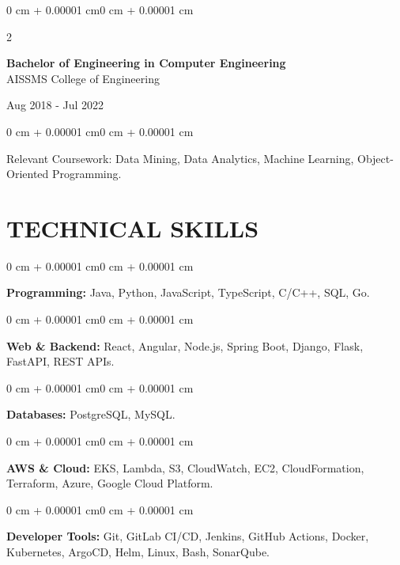\documentclass[10pt, letterpaper]{article}
\newenvironment{onecolentry}{
    \begin{adjustwidth}{0 cm + 0.00001 cm}{0 cm + 0.00001 cm}
}{
    \end{adjustwidth}
}
\newenvironment{twocolentry}[2][]{
    \onecolentry
    \def\secondColumn{#2}
    \setcolumnwidth{\fill, 4.5 cm}
    \begin{paracol}{2}
}{
    \switchcolumn \raggedleft \secondColumn
    \end{paracol}
    \endonecolentry
}
\begin{document}
\begin{twocolentry}{
    Aug 2018 - Jul 2022
}
    \textbf{Bachelor of Engineering in Computer Engineering} \\
    AISSMS College of Engineering
\end{twocolentry}
\begin{onecolentry}
Relevant Coursework: Data Mining, Data Analytics, Machine Learning, Object-Oriented Programming.
\end{onecolentry}
\section{TECHNICAL SKILLS}
\begin{onecolentry}
\textbf{Programming:} Java, Python, JavaScript, TypeScript, C/C++, SQL, Go.
\end{onecolentry}
\vspace{0.06 cm}
\begin{onecolentry}
\textbf{Web \& Backend:} React, Angular, Node.js, Spring Boot, Django, Flask, FastAPI, REST APIs.
\end{onecolentry}
\vspace{0.06 cm}
\begin{onecolentry}
\textbf{Databases:} PostgreSQL, MySQL.
\end{onecolentry}
\vspace{0.06 cm}
\begin{onecolentry}
\textbf{AWS \& Cloud:} EKS, Lambda, S3, CloudWatch, EC2, CloudFormation, Terraform, Azure, Google Cloud Platform.
\end{onecolentry}
\vspace{0.06 cm}
\begin{onecolentry}
\textbf{Developer Tools:} Git, GitLab CI/CD, Jenkins, GitHub Actions, Docker, Kubernetes, ArgoCD, Helm, Linux, Bash, SonarQube.
\end{onecolentry}

\end{document}
